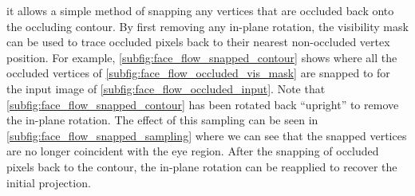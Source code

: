 it allows a simple method of snapping any vertices that are occluded back
onto the occluding contour. By first removing any in-plane rotation, the
visibility mask can be used to trace occluded pixels back to their nearest
non-occluded vertex position. For example, \cref{subfig:face_flow_snapped_contour}
shows where all the occluded vertices of \cref{subfig:face_flow_occluded_vis_mask}
are snapped to for the input image of \cref{subfig:face_flow_occluded_input}.
Note that \cref{subfig:face_flow_snapped_contour} has been rotated back
``upright'' to remove the in-plane rotation. The effect of this sampling can be seen in
\cref{subfig:face_flow_snapped_sampling} where we can see that the snapped
vertices are no longer coincident with the eye region. After the snapping of
occluded pixels back to the contour, the in-plane rotation can be reapplied
to recover the initial projection.
